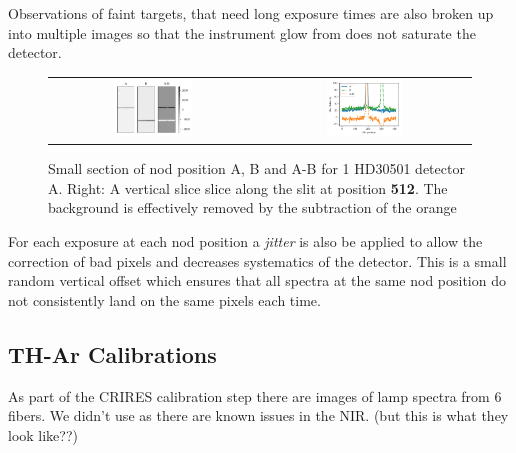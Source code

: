 Observations of faint targets, that need long exposure times are also broken up into multiple images so that the instrument glow from  does not saturate the detector.

\begin{figure}
    \centering
    \begin{tabular}{cc}
        \includegraphics[width=0.4\textwidth]{figures/reduction/nod_image_sample.pdf} &
        \includegraphics[width=0.37\textwidth]{figures/reduction/nod_slice_example.pdf}\\
    \end{tabular}
    \caption{Small section of nod position A, B and A-B for 1 HD30501 detector A. Right: A vertical slice slice along the slit at position \textbf{512}. The background is effectively removed by the subtraction of the orange}
    \label{fig:nodimages}
\end{figure}


For each exposure at each nod position a \emph{jitter} is also be applied to allow the correction of bad pixels and decreases systematics of the detector. This is a small random vertical offset which ensures that all spectra at the same nod position do not consistently land on the same pixels each time.




\subsection{TH-Ar Calibrations}
As part of the CRIRES calibration step there are images of \thar lamp spectra from 6 fibers.
We didn't use as there are known issues in the NIR. (but this is what they look like??)

